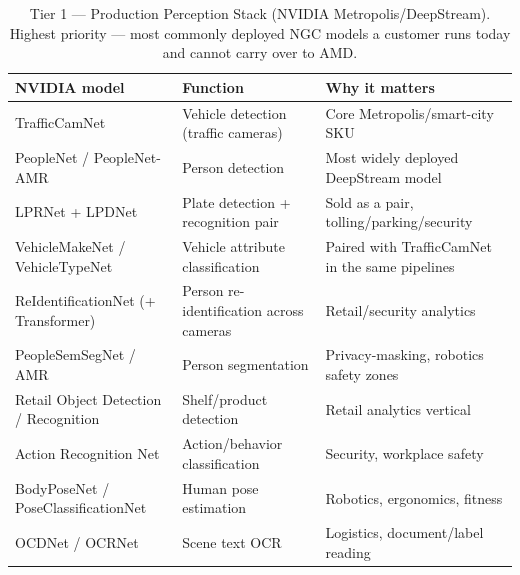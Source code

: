 \documentclass[10pt,onecolumn]{IEEEtran}
\begin{document}
\begin{table}[H]
\centering
\caption{Tier 1 --- Production Perception Stack (NVIDIA Metropolis/DeepStream). Highest priority --- most commonly deployed NGC models a customer runs today and cannot carry over to AMD.}
\label{tab:a1}
\footnotesize
\begin{tabular}{@{}p{1.6in}p{2.1in}p{2.3in}@{}}
\toprule
NVIDIA model & Function & Why it matters \\
\midrule
TrafficCamNet & Vehicle detection (traffic cameras) & Core Metropolis/smart-city SKU \\
PeopleNet / PeopleNet-AMR & Person detection & Most widely deployed DeepStream model \\
LPRNet + LPDNet & Plate detection + recognition pair & Sold as a pair, tolling/parking/security \\
VehicleMakeNet / VehicleTypeNet & Vehicle attribute classification & Paired with TrafficCamNet in the same pipelines \\
ReIdentificationNet (+ Transformer) & Person re-identification across cameras & Retail/security analytics \\
PeopleSemSegNet / AMR & Person segmentation & Privacy-masking, robotics safety zones \\
Retail Object Detection / Recognition & Shelf/product detection & Retail analytics vertical \\
Action Recognition Net & Action/behavior classification & Security, workplace safety \\
BodyPoseNet / PoseClassificationNet & Human pose estimation & Robotics, ergonomics, fitness \\
OCDNet / OCRNet & Scene text OCR & Logistics, document/label reading \\
\bottomrule
\end{tabular}
\end{table}
\end{document}
